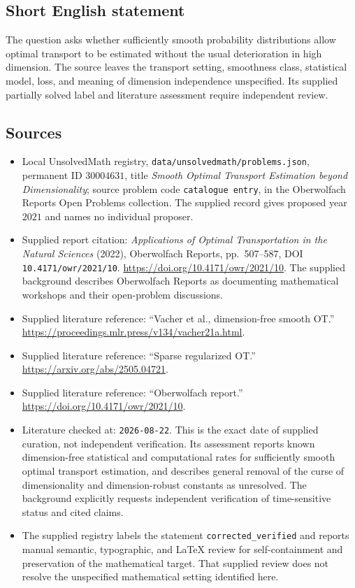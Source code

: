 \documentclass[11pt]{article}
\begin{document}
\subsection{Short English statement}
The question asks whether sufficiently smooth probability distributions allow optimal transport to be estimated without the usual deterioration in high dimension. The source leaves the transport setting, smoothness class, statistical model, loss, and meaning of dimension independence unspecified. Its supplied partially solved label and literature assessment require independent review.
\subsection{Sources}
\begin{itemize}
\item Local UnsolvedMath registry, \texttt{data/unsolvedmath/problems.json}, permanent ID \(30004631\), title \emph{Smooth Optimal Transport Estimation beyond Dimensionality}; source problem code \texttt{catalogue entry}, in the Oberwolfach Reports Open Problems collection. The supplied record gives proposed year \(2021\) and names no individual proposer.
\item Supplied report citation: \emph{Applications of Optimal Transportation in the Natural Sciences} (2022), Oberwolfach Reports, pp.~507--587, DOI \texttt{10.4171/owr/2021/10}. \url{https://doi.org/10.4171/owr/2021/10}. The supplied background describes Oberwolfach Reports as documenting mathematical workshops and their open-problem discussions.
\item Supplied literature reference: ``Vacher et al., dimension-free smooth OT.'' \url{https://proceedings.mlr.press/v134/vacher21a.html}.
\item Supplied literature reference: ``Sparse regularized OT.'' \url{https://arxiv.org/abs/2505.04721}.
\item Supplied literature reference: ``Oberwolfach report.'' \url{https://doi.org/10.4171/owr/2021/10}.
\item Literature checked at: \texttt{2026-08-22}. This is the exact date of supplied curation, not independent verification. Its assessment reports known dimension-free statistical and computational rates for sufficiently smooth optimal transport estimation, and describes general removal of the curse of dimensionality and dimension-robust constants as unresolved. The background explicitly requests independent verification of time-sensitive status and cited claims.
\item The supplied registry labels the statement \texttt{corrected\_verified} and reports manual semantic, typographic, and LaTeX review for self-containment and preservation of the mathematical target. That supplied review does not resolve the unspecified mathematical setting identified here.
\end{itemize}
\end{document}
